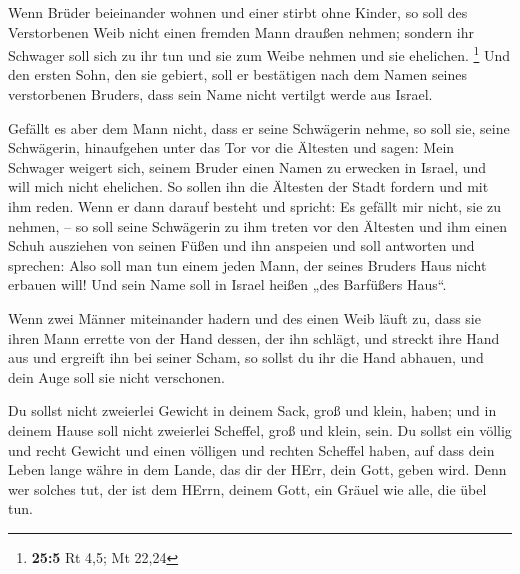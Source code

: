  Wenn Brüder beieinander wohnen und einer stirbt ohne
Kinder, so soll des Verstorbenen Weib nicht einen fremden Mann draußen
nehmen; sondern ihr Schwager soll sich zu ihr tun und sie zum Weibe
nehmen und sie ehelichen. \footnote{\textbf{25:5} Rt 4,5; Mt 22,24}
 Und den ersten Sohn, den sie gebiert, soll er bestätigen
nach dem Namen seines verstorbenen Bruders, dass sein Name nicht
vertilgt werde aus Israel.

 Gefällt es aber dem Mann nicht, dass er seine Schwägerin
nehme, so soll sie, seine Schwägerin, hinaufgehen unter das Tor vor die
Ältesten und sagen: Mein Schwager weigert sich, seinem Bruder einen
Namen zu erwecken in Israel, und will mich nicht ehelichen. 
So sollen ihn die Ältesten der Stadt fordern und mit ihm reden. Wenn er
dann darauf besteht und spricht: Es gefällt mir nicht, sie zu nehmen, --
 so soll seine Schwägerin zu ihm treten vor den Ältesten und
ihm einen Schuh ausziehen von seinen Füßen und ihn anspeien und soll
antworten und sprechen: Also soll man tun einem jeden Mann, der seines
Bruders Haus nicht erbauen will!  Und sein Name soll in
Israel heißen „des Barfüßers Haus``.

 Wenn zwei Männer miteinander hadern und des einen Weib
läuft zu, dass sie ihren Mann errette von der Hand dessen, der ihn
schlägt, und streckt ihre Hand aus und ergreift ihn bei seiner Scham,
 so sollst du ihr die Hand abhauen, und dein Auge soll sie
nicht verschonen.

 Du sollst nicht zweierlei Gewicht in deinem Sack, groß und
klein, haben;  und in deinem Hause soll nicht zweierlei
Scheffel, groß und klein, sein.  Du sollst ein völlig und
recht Gewicht und einen völligen und rechten Scheffel haben, auf dass
dein Leben lange währe in dem Lande, das dir der HErr, dein Gott, geben
wird.  Denn wer solches tut, der ist dem HErrn, deinem
Gott, ein Gräuel wie alle, die übel tun.

